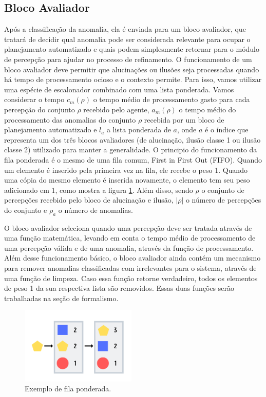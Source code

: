 \subsection{Bloco Avaliador}

Após a classificação da anomalia, ela é enviada para um bloco avaliador, que tratará de decidir qual anomalia pode ser considerada relevante para ocupar o planejamento automatizado e quais podem simplesmente retornar para o módulo de percepção para ajudar no processo de refinamento.
O funcionamento de um bloco avaliador deve permitir que alucinações ou ilusões seja processadas quando há tempo de processamento ocioso e o contexto permite. Para isso, vamos utilizar uma espécie de escalonador combinado com uma lista ponderada. Vamos considerar o tempo $c_m(\rho)$ o tempo médio de processamento gasto para cada percepção do conjunto $\rho$ recebido pelo agente, $a_m(\rho)$ o tempo médio do processamento das anomalias do conjunto $\rho$ recebida por um bloco de planejamento automatizado e $l_a$ a lista ponderada de $a$, onde $a$ é o índice que representa um dos três blocos avaliadores (de alucinação, ilusão classe 1 ou ilusão classe 2) utilizado para manter a generalidade. O principio do funcionamento da fila ponderada é o mesmo de uma fila comum, First in First Out (FIFO). Quando um elemento é inserido pela primeira vez na fila, ele recebe o peso 1. Quando uma cópia do mesmo elemento é inserida novamente, o elemento tem seu peso adicionado em 1, como mostra a figura \ref{filaPonderada}. Além disso, sendo $\rho$ o conjunto de percepções recebido pelo bloco de alucinação e ilusão, $|\rho|$ o número de percepções do conjunto e $\rho_a$ o número de anomalias.

O bloco avaliador seleciona quando uma percepção deve ser tratada através de uma função matemática, levando em conta o tempo médio de processamento de uma percepção válida e de uma anomalia, através da função de processamento. Além desse funcionamento básico, o bloco avaliador ainda contém um mecanismo para remover anomalias classificadas com irrelevantes para o sistema, através de uma função de limpeza. Caso essa função retorne verdadeiro, todos os elementos de peso 1 da sua respectiva lista são removidos. Essas duas funções serão trabalhadas na seção de formalismo.

\begin{figure}[h!]
    \centering
    \includegraphics[width=0.49\textwidth]{Images/filaPonderada.png}
    \caption{Exemplo de fila ponderada.}
    \label{filaPonderada}
\end{figure}

